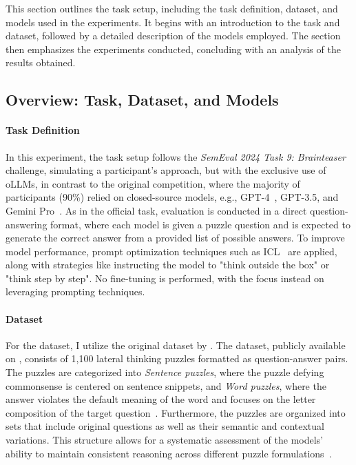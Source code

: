 This section outlines the task setup, including the task definition, dataset, and models used in the experiments. It begins with an introduction to the task and dataset, followed by a detailed description of the models employed. The section then emphasizes the experiments conducted, concluding with an analysis of the results obtained.

\subsection{Overview: Task, Dataset, and Models}

\paragraph{Task Definition}
In this experiment, the task setup follows the \textit{SemEval 2024 Task 9: Brainteaser}~\cite{jiangBRAINTEASERLateralThinking2023} challenge, simulating a participant's approach, but with the exclusive use of \acp{oLLM}, in contrast to the original competition, where the majority of participants (90\%) relied on closed-source models, e.g., \acs{GPT}-4~\cite{openaiGPT4TechnicalReport2024}, \acs{GPT}-3.5, and Gemini Pro~\cite{teamGeminiFamilyHighly2024}. As in the official task, evaluation is conducted in a direct question-answering format, where each model is given a puzzle question and is expected to generate the correct answer from a provided list of possible answers. To improve model performance, prompt optimization techniques such as \ac{ICL}~\cite{brownLanguageModelsAre2020} are applied, along with strategies like instructing the model to "think outside the box" or "think step by step". No fine-tuning is performed, with the focus instead on leveraging prompting techniques.

\paragraph{Dataset}
For the dataset, I utilize the original  dataset by \citeauthor{jiangBRAINTEASERLateralThinking2023}. The dataset, publicly available on , consists of 1,100 lateral thinking puzzles formatted as question-answer pairs. The puzzles are categorized into \textit{Sentence puzzles}, where the puzzle defying commonsense is centered on sentence snippets, and \textit{Word puzzles}, where the answer violates the default meaning of the word and focuses on the letter composition of the target question~\cite{jiangBRAINTEASERLateralThinking2023}. Furthermore, the puzzles are organized into sets that include original questions as well as their semantic and contextual variations. This structure allows for a systematic assessment of the models' ability to maintain consistent reasoning across different puzzle formulations~\cite{jiangBRAINTEASERLateralThinking2023}.

